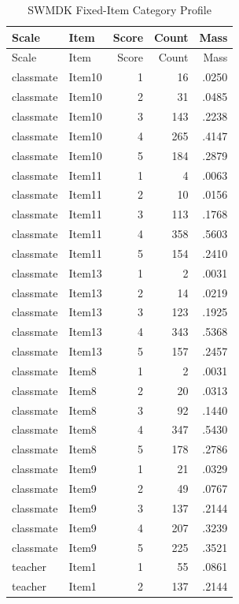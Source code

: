 {\small
\setlength{\tabcolsep}{5pt}
\begin{longtable}{llrrr}
\caption{SWMDK Fixed-Item Category Profile}
\label{tab:categories} \\
\toprule
Scale & Item & Score & Count & Mass \\
\midrule
\endfirsthead
\toprule
Scale & Item & Score & Count & Mass \\
\midrule
\endhead
classmate & Item10 & 1 & 16 & .0250 \\
classmate & Item10 & 2 & 31 & .0485 \\
classmate & Item10 & 3 & 143 & .2238 \\
classmate & Item10 & 4 & 265 & .4147 \\
classmate & Item10 & 5 & 184 & .2879 \\
classmate & Item11 & 1 & 4 & .0063 \\
classmate & Item11 & 2 & 10 & .0156 \\
classmate & Item11 & 3 & 113 & .1768 \\
classmate & Item11 & 4 & 358 & .5603 \\
classmate & Item11 & 5 & 154 & .2410 \\
classmate & Item13 & 1 & 2 & .0031 \\
classmate & Item13 & 2 & 14 & .0219 \\
classmate & Item13 & 3 & 123 & .1925 \\
classmate & Item13 & 4 & 343 & .5368 \\
classmate & Item13 & 5 & 157 & .2457 \\
classmate & Item8 & 1 & 2 & .0031 \\
classmate & Item8 & 2 & 20 & .0313 \\
classmate & Item8 & 3 & 92 & .1440 \\
classmate & Item8 & 4 & 347 & .5430 \\
classmate & Item8 & 5 & 178 & .2786 \\
classmate & Item9 & 1 & 21 & .0329 \\
classmate & Item9 & 2 & 49 & .0767 \\
classmate & Item9 & 3 & 137 & .2144 \\
classmate & Item9 & 4 & 207 & .3239 \\
classmate & Item9 & 5 & 225 & .3521 \\
teacher & Item1 & 1 & 55 & .0861 \\
teacher & Item1 & 2 & 137 & .2144 \\

\end{longtable}}
